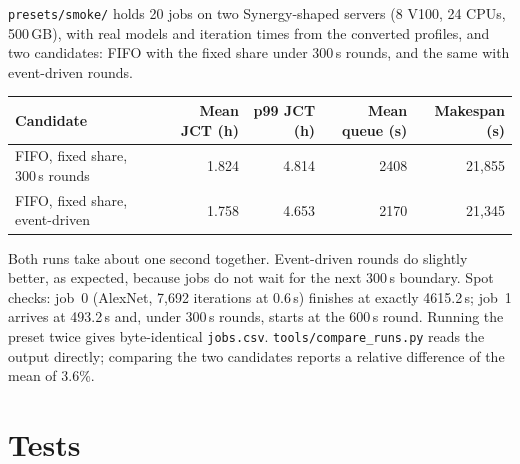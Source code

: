 \documentclass[11pt,a4paper]{article}
\newcommand{\code}[1]{\texttt{#1}}
\begin{document}
\code{presets/smoke/} holds 20 jobs on two Synergy-shaped servers (8 V100, 24 CPUs, 500\,GB), with
real models and iteration times from the converted profiles, and two candidates: FIFO with the fixed
share under 300\,s rounds, and the same with event-driven rounds.

\begin{center}
\begin{tabular}{@{}lrrrr@{}}
\toprule
Candidate & Mean JCT (h) & p99 JCT (h) & Mean queue (s) & Makespan (s) \\
\midrule
FIFO, fixed share, 300\,s rounds & 1.824 & 4.814 & 2408 & 21{,}855 \\
FIFO, fixed share, event-driven & 1.758 & 4.653 & 2170 & 21{,}345 \\
\bottomrule
\end{tabular}
\end{center}

Both runs take about one second together. Event-driven rounds do slightly better, as expected,
because jobs do not wait for the next 300\,s boundary. Spot checks: job~0 (AlexNet, 7,692
iterations at 0.6\,s) finishes at exactly 4615.2\,s; job~1 arrives at 493.2\,s and, under 300\,s
rounds, starts at the 600\,s round. Running the preset twice gives byte-identical \code{jobs.csv}.
\code{tools/compare\_runs.py} reads the output directly; comparing the two candidates reports a
relative difference of the mean of 3.6\%.

\section{Tests}
\end{document}
